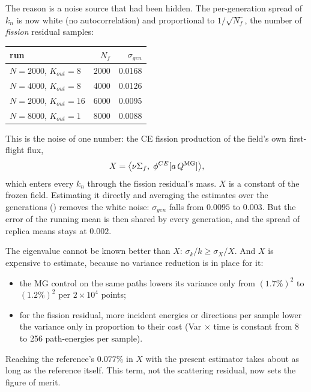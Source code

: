 The reason is a noise source that had been hidden. The per-generation spread of $k_n$ is now white
(no autocorrelation) and proportional to $1/\sqrt{N_f}$, the number of \emph{fission} residual
samples:
\begin{center}\small
\begin{tabular}{@{}lrr@{}}
\toprule
run & $N_f$ & $\sigma_{gen}$\\
\midrule
$N=2000$, $K_{out}=8$ & 2000 & 0.0168\\
$N=4000$, $K_{out}=8$ & 4000 & 0.0126\\
$N=2000$, $K_{out}=16$ & 6000 & 0.0095\\
$N=8000$, $K_{out}=1$ & 8000 & 0.0088\\
\bottomrule
\end{tabular}
\end{center}
This is the noise of one number: the CE fission production of the field's own first-flight flux,
\begin{equation}
X=\big\langle\nu\Sigma_f,\;\phi^{CE}[a\,Q^{\mathrm{MG}}]\big\rangle,
\end{equation}
which enters every $k_n$ through the fission residual's mass. $X$ is a constant of the frozen field.
Estimating it directly and averaging the estimates over the generations
() removes the white noise: $\sigma_{gen}$ falls from $0.0095$ to
$0.003$. But the error of the running mean is then shared by every generation, and the spread of
replica means stays at $0.002$.

The eigenvalue cannot be known better than $X$: $\sigma_k/k\ge\sigma_X/X$. And $X$ is expensive to
estimate, because no variance reduction is in place for it:
\begin{itemize}
\item the MG control on the same paths lowers its variance only from $(1.7\%)^2$ to $(1.2\%)^2$ per
  $2\times10^4$ points;
\item for the fission residual, more incident energies or directions per sample lower the variance
  only in proportion to their cost (Var $\times$ time is constant from 8 to 256 path-energies per
  sample).
\end{itemize}
Reaching the reference's $0.077\%$ in $X$ with the present estimator takes about as long as the
reference itself. This term, not the scattering residual, now sets the figure of merit.


